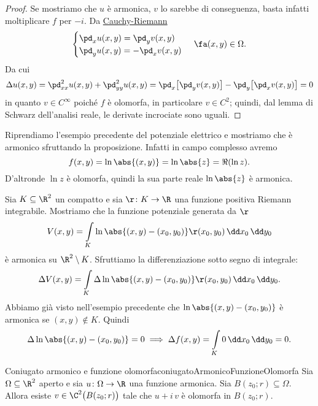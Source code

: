 \begin{proof}
	Se mostriamo che \(u\) è armonica, \(v\) lo sarebbe di conseguenza, basta infatti moltiplicare \(f\) per \(-i\).
	Da \hyperref[pr:equazioniCauchyRiemann]{Cauchy-Riemann}
	\[
		\begin{cases}
			\pd_x u(x,y) = \pd_y v(x,y) \\
			\pd_y u(x,y) = -\pd_x v(x,y)
		\end{cases}
		\,\fa (x,y)\in\Omega.
	\]
	Da cui
	\[
		\Delta u(x,y) = \pd_{xx}^2 u(x,y) +\pd_{yy}^2 u(x,y) = \pd_x\big[\pd_y v(x,y)\big] - \pd_y\big[\pd_x v(x,y)\big] = 0
	\]
	in quanto \(v\in C^{\infty}\) poiché \(f\) è olomorfa, in particolare \(v\in C^2\); quindi, dal lemma di Schwarz dell'analisi reale, le derivate incrociate sono uguali.
\end{proof}

\begin{ese}
	Riprendiamo l'esempio precedente del potenziale elettrico e mostriamo che è armonico sfruttando la proposizione.
	Infatti in campo complesso avremo
	\[
		f(x,y) = \ln\abs{(x,y)} = \ln \abs{z} = \Re(\ln z).
	\]
	D'altronde \(\ln z\) è olomorfa, quindi la sua parte reale \(\ln \abs{z}\) è armonica.
\end{ese}

\begin{ese}
	Sia \(K\subseteq \R^2\) un compatto e sia \(\r\colon K \to \R\) una funzione positiva Riemann integrabile. Mostriamo che la funzione potenziale generata da \(\r\)
	\[
		V(x,y) = \int\limits_K \ln\abs{(x,y)-(x_0,y_0)}\r(x_0,y_0)\,\dd x_0\,\dd y_0
	\]
	è armonica su \(\R^2\setminus K\).
	Sfruttiamo la differenziazione sotto segno di integrale:
	\[
		\Delta V(x,y) = \int\limits_K \Delta\ln\abs{(x,y)-(x_0,y_0)}\r(x_0,y_0)\,\dd x_0\,\dd y_0.
	\]
	Abbiamo già visto nell'esempio precedente che \(\ln\abs{(x,y)-(x_0,y_0)}\) è armonica se \((x,y)\not\in K\). Quindi
	\[
		\Delta\ln\abs{(x,y)-(x_0,y_0)} = 0 \implies \Delta f(x,y) = \int\limits_K 0\,\dd x_0\,\dd y_0 = 0.
	\]
\end{ese}

\begin{teor}{Coniugato armonico e funzione olomorfa}{coniugatoArmonicoFunzioneOlomorfa}
	Sia \(\Omega\subseteq\R^2\) aperto e sia \(u\colon \Omega \to \R\) una funzione armonica. Sia \(B(z_0;r)\subseteq \Omega\).
	Allora esiste \(v\in\C^2\big(B(z_0;r)\big)\) tale che \(u+i\,v\) è olomorfa in \(B(z_0;r)\).
\end{teor}

